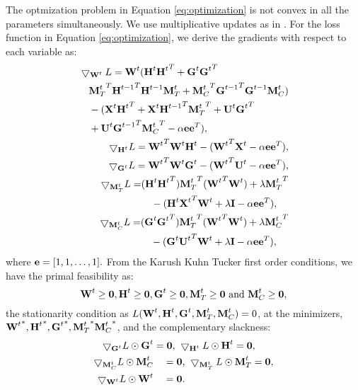 The optmization problem in Equation \ref{eq:optimization} is not convex in all the parameters simultaneously.  
We use multiplicative updates as
in \cite{lee_1999}.  For the loss function in Equation \ref{eq:optimization}, we derive the gradients with respect to each
variable as:
\begin{eqnarray}
\begin{split}
& \bigtriangledown_{\textbf{W}^t}L = \textbf{W}^t(\textbf{H}^t{\textbf{H}^t}^{T} + \textbf{G}^t{\textbf{G}^t}^{T} \\
		&\quad {\textbf{M}^t_T}^{T}{\textbf{H}^{t-1}}^{T}\textbf{H}^{t-1}\textbf{M}^t_T + {\textbf{M}^t_C}^{T}{\textbf{G}^{t-1}}^{T}\textbf{G}^{t-1}\textbf{M}^t_C) \\
	&\quad - (\textbf{X}^t{\textbf{H}^t}^{T}+\textbf{X}^t{\textbf{H}^{t-1}}^{T}{\textbf{M}^t_T}^{T} + \textbf{U}^t{\textbf{G}^t}^{T}\\
	&\quad+\textbf{U}^t{\textbf{G}^{t-1}}^{T}{\textbf{M}^t_C}^{T} - \alpha\textbf{e}{\textbf{e}}^{T}) , \label{eq:gradient_W}
\end{split} \\
\bigtriangledown_{\textbf{H}^t}L = {\textbf{W}^t}^T\textbf{W}^t\textbf{H}^t - ({\textbf{W}^t}^T\textbf{X}^t - \alpha\textbf{e}{\textbf{e}}^T), \\
\bigtriangledown_{\textbf{G}^t}L = {\textbf{W}^t}^T\textbf{W}^t\textbf{G}^t - ({\textbf{W}^t}^T\textbf{U}^t - \alpha\textbf{e}{\textbf{e}}^T), \\
\begin{split}
\bigtriangledown_{\textbf{M}^t_T}L = &  (\textbf{H}^t{\textbf{H}^t}^{T}){\textbf{M}^t_T}^{T}({\textbf{W}^t}^{T}\textbf{W}^t) + \lambda {\textbf{M}^t_T}^{T} \\
						&\quad- (\textbf{H}^t{\textbf{X}^t}^{T}\textbf{W}^t+\lambda\textbf{I} - \alpha\textbf{e}{\textbf{e}}^{T}), \\
\end{split} \\
\begin{split}
\bigtriangledown_{\textbf{M}^t_C}L = &  (\textbf{G}^t{\textbf{G}^t}^{T}){\textbf{M}^t_T}^{T}({\textbf{W}^t}^{T}\textbf{W}^t) + \lambda {\textbf{M}^t_C}^{T} \\
						&\quad  - (\textbf{G}^t{\textbf{U}^t}^{T}\textbf{W}^t+\lambda\textbf{I} - \alpha\textbf{e}{\textbf{e}}^{T}), \\ \label{eq:gradient_MC}
\end{split}
\end{eqnarray}
where $\textbf{e} = [1,1,\ldots,1].$
From the Karush Kuhn Tucker first order conditions, we have the primal feasibility as:
\vspace{-0.2cm}
\begin{equation}
\W \geq \0, \HH \geq \0, \G \geq \0, \MT \geq \0 \text{ and } \MC \geq \0,
\label{eq:primal_feasibility}
\end{equation}
the stationarity condition as $L(\textbf{W}^t,\textbf{H}^t,\textbf{G}^t,\textbf{M}^t_T,\textbf{M}^t_C) = 0$, at the minimizers, ${\textbf{W}^t}^*, {\textbf{H}^t}^*, {\textbf{G}^t}^*, {\textbf{M}^t_T}^*
{\textbf{M}^t_C}^*$, and the complementary slackness:
\begin{equation}
\begin{split}
\bigtriangledown_{\G}L \odot \G & = \mathbf{0} \text{,  } \bigtriangledown_{\HH}L \odot \HH = \mathbf{0}, \\
\bigtriangledown_{\MC}L \odot \MC &\quad = \mathbf{0} \text{,  } \bigtriangledown_{\MT}L \odot \MT = \mathbf{0}, \\
\bigtriangledown_{\W}L \odot \W & \quad = \mathbf{0}.
\label{eq:KKT}
\end{split}
\end{equation}
